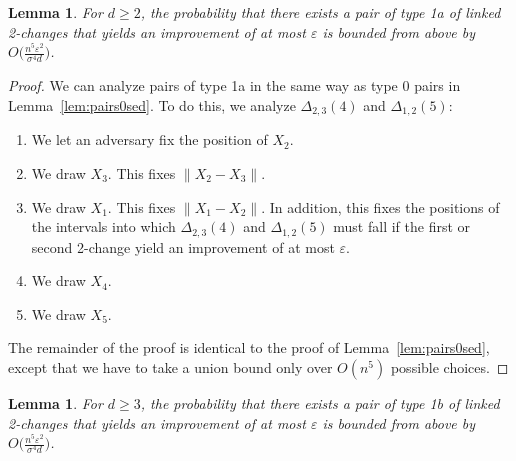 \documentclass[11pt,DIV=12,a4paper]{scrartcl}
\newtheorem{lemma}[claim]{Lemma}
\newcommand{\eps}{\varepsilon}
\begin{document}
\begin{lemma}
\label{lem:pairs1ased}
For $d \geq 2$, the probability that there exists a pair of type 1a of linked 2-changes that yields an improvement of at most $\eps$ is bounded
from above by $O\bigl(\frac{n^5 \eps^2}{\sigma^{4}d}\bigr)$.
\end{lemma}


\begin{proof}
We can analyze pairs of type 1a in the same way as type 0 pairs in Lemma~\ref{lem:pairs0sed}. To do this, we analyze
$\Delta_{2,3}(4)$ and $\Delta_{1,2}(5)$:
\begin{enumerate}[label=\arabic{*}.]
\item We let an adversary fix the position of $X_2$.
\item We draw $X_3$. This fixes $\|X_2 - X_3\|$.
\item We draw $X_1$. This fixes $\|X_1 - X_2\|$. In addition, this fixes the positions of the intervals
into which $\Delta_{2,3}(4)$ and $\Delta_{1,2}(5)$ must fall if the first or second 2-change yield an improvement of at most $\eps$.
\item We draw $X_4$.
\item We draw $X_5$.
\end{enumerate}
The remainder of the proof is identical to the proof of Lemma~\ref{lem:pairs0sed}, except that we have to take a union bound only
over $O(n^5)$ possible choices.
\end{proof}


\begin{lemma}
\label{lem:pairs1bsed}
For $d \geq 3$, the probability that there exists a pair of type 1b of linked 2-changes that yields an improvement of at most $\eps$ is bounded
from above by $O\bigl(\frac{n^5 \eps^2}{\sigma^{4}d}\bigr)$.
\end{lemma}
\end{document}
